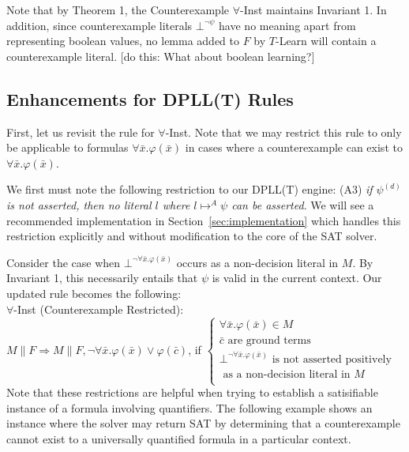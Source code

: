 \documentclass{llncs}
\begin{document}
Note that by Theorem 1, the Counterexample $\forall$-Inst maintains Invariant 1.
In addition, since counterexample literals $\bot^{ \neg \psi }$ have no meaning apart from representing boolean values, no lemma added to $F$ by $T$-Learn will contain a counterexample literal.
[do this: What about boolean learning?]

\subsection{Enhancements for DPLL(T) Rules}

First, let us revisit the rule for $\forall$-Inst.
Note that we may restrict this rule to only be applicable to formulas $\forall \bar{x}. \varphi( \bar{ x } )$ in cases where a counterexample can exist to $\forall \bar{x}. \varphi( \bar{ x } )$.

We first must note the following restriction to our DPLL(T) engine: (A3) \emph{if $\psi^{(d)}$ is not asserted, then no literal $l$ where $l \mapsto^A \psi$ can be asserted}.
We will see a recommended implementation in Section~\ref{sec:implementation} which handles this restriction explicitly and without modification to the core of the SAT solver.

Consider the case when $\bot^{\neg \forall \bar{x}. \varphi( \bar{ x } )}$ occurs as a non-decision literal in $M$.
By Invariant 1, this necessarily entails that $\psi$ is valid in the current context.
Our updated rule becomes the following: \\

\noindent $\forall$-Inst (Counterexample Restricted): \\

$M \parallel F \Longrightarrow M \parallel F, \neg \forall \bar{x}. \varphi( \bar{ x } ) \vee \varphi( \bar{ c } )$, if   
$\begin{cases}
  \forall \bar{x}. \varphi( \bar{ x } ) \in M \\
  \bar{ c } \text{ are ground terms} \\
  \bot^{\neg \forall \bar{x}. \varphi( \bar{ x } )} \text{ is not asserted positively }\\
  \text{ \ \ \ as a non-decision literal in $M$ } \\    
\end{cases}$ \\

Note that these restrictions are helpful when trying to establish a satisifiable instance of a formula involving quantifiers.
The following example shows an instance where the solver may return SAT by determining that a counterexample cannot exist to a universally quantified formula in a particular context.
\end{document}
